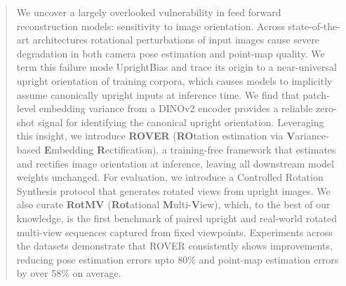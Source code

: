 \vspace{-3mm}
\begin{abstract}
We uncover a largely overlooked vulnerability in feed forward reconstruction models: sensitivity to image orientation.
Across state-of-the-art architectures rotational perturbations of input images cause severe degradation in both camera pose estimation and point-map quality.
We term this failure mode UprightBias and trace its origin to a near-universal upright orientation of training corpora, which causes models to implicitly assume canonically upright inputs at inference time.
We find that patch-level embedding variance from a DINOv2 encoder provides a reliable zero-shot signal for identifying the canonical upright orientation.
Leveraging this insight, we introduce \textbf{ROVER} (\textbf{RO}tation estimation via \textbf{V}ariance-based \textbf{E}mbedding \textbf{R}ectification), a training-free framework that estimates and rectifies image orientation at inference, leaving all downstream model weights unchanged.
For evaluation, we introduce a Controlled Rotation Synthesis protocol that generates rotated views from upright images. 
We also curate \textbf{RotMV} (\textbf{Rot}ational \textbf{M}ulti-\textbf{V}iew), which, to the best of our knowledge, is the first benchmark of paired upright and real-world rotated multi-view sequences captured from fixed viewpoints.
Experiments across the datasets demonstrate that ROVER consistently shows improvements, reducing pose estimation errors upto 80\% and point-map estimation errors by over 58\% on average.
\end{abstract}